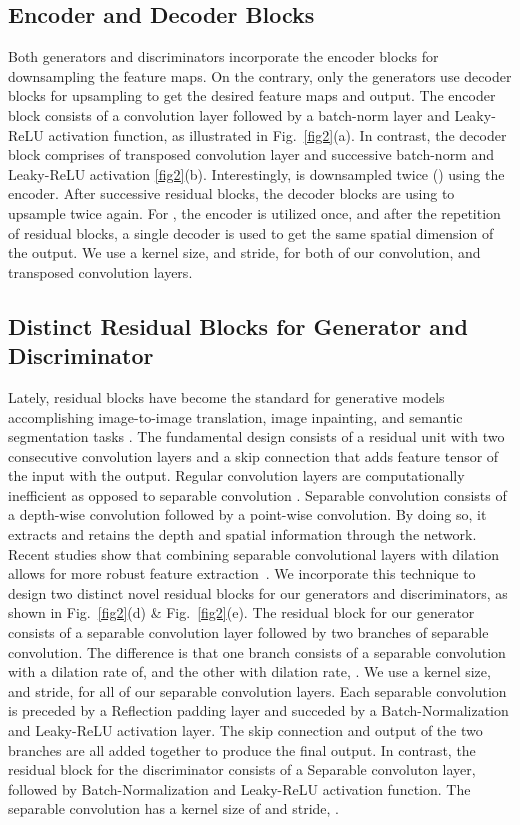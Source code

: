 \documentclass[a4paper,conference]{IEEEtran}
\begin{document}
\subsection{Encoder and Decoder Blocks}
\label{subsec:encdec}
Both generators and discriminators incorporate the encoder blocks for downsampling the feature maps. On the contrary, only the generators use decoder blocks for upsampling to get the desired feature maps and output. The encoder block consists of a convolution layer followed by a batch-norm layer \cite{ioffe2015batch} and Leaky-ReLU activation function, as illustrated in Fig.~\ref{fig2}(a). In contrast, the decoder block comprises of transposed convolution layer and successive batch-norm \cite{ioffe2015batch} and Leaky-ReLU activation \ref{fig2}(b).  Interestingly,  is downsampled twice () using the encoder. After successive residual blocks, the decoder blocks are using to upsample twice again. For , the encoder is utilized once, and after the repetition of residual blocks, a single decoder is used to get the same spatial dimension of the output. We use a kernel size,  and stride,  for both of our convolution, and transposed convolution layers. 

\subsection{Distinct Residual Blocks for Generator and Discriminator}
\label{subsec:residualblock}
Lately, residual blocks have become the standard for generative models accomplishing image-to-image translation, image inpainting, and semantic segmentation tasks \cite{wang2018high,park2019semantic}. The fundamental design consists of a residual unit with two consecutive convolution layers and a skip connection that adds feature tensor of the input with the output. Regular convolution layers are computationally inefficient as opposed to separable convolution \cite{chollet2017xception}. Separable convolution consists of a depth-wise convolution followed by a point-wise convolution. By doing so, it extracts and retains the depth and spatial information through the network. Recent studies show that combining separable convolutional layers with dilation allows for more robust feature extraction~\cite{opticnet19}. We incorporate this technique to design two distinct novel residual blocks for our generators and discriminators, as shown in Fig.~\ref{fig2}(d) \& Fig.~\ref{fig2}(e). The residual block for our generator consists of a separable convolution layer followed by two branches of separable convolution. The difference is that one branch consists of a separable convolution with a dilation rate of,  and the other with dilation rate, . We use a kernel size,  and stride,  for all of our separable convolution layers. Each separable convolution is preceded by a Reflection padding layer and succeded by a Batch-Normalization and Leaky-ReLU activation layer. The skip connection and output of the two branches are all added together to produce the final output. In contrast, the residual block for the discriminator consists of a Separable convoluton layer, followed by Batch-Normalization and Leaky-ReLU activation function. The separable convolution has a kernel size of  and stride, .
\end{document}
